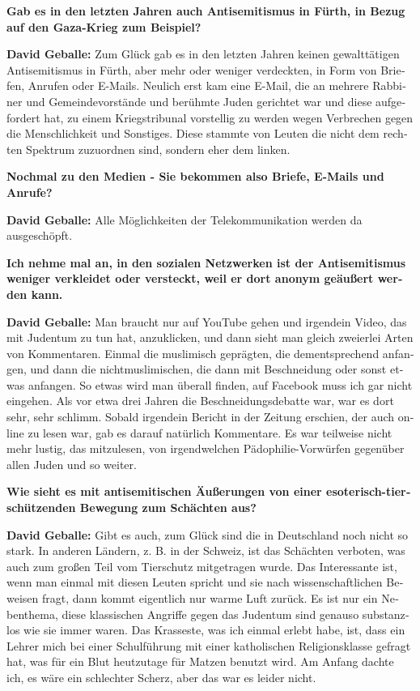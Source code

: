 \begin{otherlanguage}{ngerman}
\textbf{Gab es in den letzten Jahren auch Antisemitismus in Fürth, in Bezug auf den Gaza-Krieg zum Beispiel?} 

\textbf{David Geballe:} Zum Glück gab es in den letzten Jahren keinen gewalttätigen Antisemitismus in Fürth, aber mehr oder weniger verdeckten, in Form von Briefen, Anrufen oder E-Mails. Neulich erst kam eine E-Mail, die an mehrere Rabbiner und Gemeindevorstände und berühmte Juden gerichtet war und diese aufgefordert hat, zu einem Kriegstribunal vorstellig zu werden wegen Verbrechen gegen die Menschlichkeit und Sonstiges. Diese stammte von Leuten die nicht dem rechten Spektrum zuzuordnen sind, sondern eher dem linken. 

\textbf{Nochmal zu den Medien - Sie bekommen also Briefe, E-Mails und Anrufe?} 

\textbf{David Geballe:} Alle Möglichkeiten der Telekommunikation werden da ausgeschöpft. 

\textbf{Ich nehme mal an, in den sozialen Netzwerken ist der Antisemitismus weniger verkleidet oder versteckt, weil er dort anonym geäußert werden kann.} 

\textbf{David Geballe:} Man braucht nur auf YouTube gehen und irgendein Video, das mit Judentum zu tun hat, anzuklicken, und dann sieht man gleich zweierlei Arten von Kommentaren. Einmal die muslimisch geprägten, die dementsprechend anfangen, und dann die nichtmuslimischen, die dann mit Beschneidung oder sonst etwas anfangen. So etwas wird man überall finden, auf Facebook muss ich gar nicht eingehen. Als vor etwa drei Jahren die Beschneidungsdebatte war, war es dort sehr, sehr schlimm. Sobald irgendein Bericht in der Zeitung erschien, der auch online zu lesen war, gab es darauf natürlich Kommentare. Es war teilweise nicht mehr lustig, das mitzulesen, von irgendwelchen Pädophilie-Vorwürfen gegenüber allen Juden und so weiter. 

\textbf{Wie sieht es mit antisemitischen Äußerungen von einer esoterisch-tierschützenden Bewegung zum Schächten aus?}

\textbf{David Geballe:} Gibt es auch, zum Glück sind die in Deutschland noch nicht so stark. In anderen Ländern, z. B. in der Schweiz, ist das Schächten verboten, was auch zum großen Teil vom Tierschutz mitgetragen wurde. Das Interessante ist, wenn man einmal mit diesen Leuten spricht und sie nach wissenschaftlichen Beweisen fragt, dann kommt eigentlich nur warme Luft zurück. Es ist nur ein Nebenthema, diese klassischen Angriffe gegen das Judentum sind genauso substanzlos wie sie immer waren. Das Krasseste, was ich einmal erlebt habe, ist, dass ein Lehrer mich bei einer Schulführung mit einer katholischen Religionsklasse gefragt hat, was für ein Blut heutzutage für Matzen benutzt wird. Am Anfang dachte ich, es wäre ein schlechter Scherz, aber das war es leider nicht. 


\end{otherlanguage}
